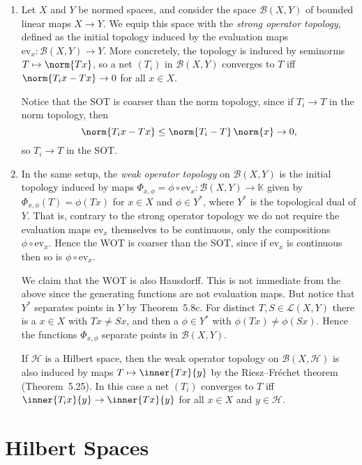 \documentclass[article, a4paper, 11pt, oneside]{memoir}
\numberwithin{equation}{chapter}
\newcommand{\ev}{\mathrm{ev}}
\newcommand{\calB}{\mathcal{B}}
\newcommand{\calH}{\mathcal{H}}
\newcommand{\calL}{\mathcal{L}}
\newcommand{\bbK}{\mathbb{K}}
\theoremstyle{nonumberplain}
\begin{document}
\begin{remarkbreak}
\begin{enumerate}
		\item Let $X$ and $Y$ be normed spaces, and consider the space $\calB(X,Y)$ of bounded linear maps $X \to Y$. We equip this space with the \emph{strong operator topology}, defined as the initial topology induced by the evaluation maps $\ev_x \colon \calB(X,Y) \to Y$. More concretely, the topology is induced by seminorms $T \mapsto \norm{Tx}$, so a net $(T_i)$ in $\calB(X,Y)$ converges to $T$ iff $\norm{T_i x - Tx} \to 0$ for all $x \in X$.
		
		Notice that the SOT is coarser than the norm topology, since if $T_i \to T$ in the norm topology, then
		\begin{equation*}
			\norm{T_i x - Tx}
				\leq \norm{T_i - T} \, \norm{x}
				\to 0,
		\end{equation*}
		so $T_i \to T$ in the SOT.
		
		\item In the same setup, the \emph{weak operator topology} on $\calB(X,Y)$ is the initial topology induced by maps $\Phi_{x,\phi} = \phi \circ \ev_x \colon \calB(X,Y) \to \bbK$ given by $\Phi_{x,\phi}(T) = \phi(Tx)$ for $x \in X$ and $\phi \in Y^*$, where $Y^*$ is the topological dual of $Y$. That is, contrary to the strong operator topology we do not require the evaluation maps $\ev_x$ themselves to be continuous, only the compositions $\phi \circ \ev_x$. Hence the WOT is coarser than the SOT, since if $\ev_x$ is continuous then so is $\phi \circ \ev_x$.
		
		We claim that the WOT is also Hausdorff. This is not immediate from the above since the generating functions are not evaluation maps. But notice that $Y^*$ separates points in $Y$ by Theorem~5.8c. For distinct $T,S \in \calL(X,Y)$ there is a $x \in X$ with $Tx \neq Sx$, and then a $\phi \in Y^*$ with $\phi(Tx) \neq \phi(Sx)$. Hence the functions $\Phi_{x,\phi}$ separate points in $\calB(X,Y)$.
		
		If $\calH$ is a Hilbert space, then the weak operator topology on $\calB(X,\calH)$ is also induced by maps $T \mapsto \inner{Tx}{y}$ by the Riesz--Fréchet theorem (Theorem~5.25). In this case a net $(T_i)$ converges to $T$ iff $\inner{T_i x}{y} \to \inner{Tx}{y}$ for all $x \in X$ and $y \in \calH$.
	\end{enumerate}
\end{remarkbreak}


\section{Hilbert Spaces}
\end{document}
